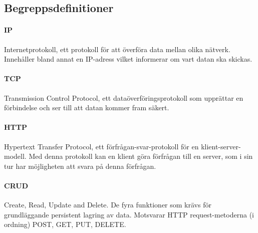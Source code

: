 \subsection{Begreppsdefinitioner}

\paragraph{IP} 
\label{ip}
Internetprotokoll, ett protokoll för att överföra data mellan olika nätverk. Innehåller bland annat en IP-adress vilket informerar om vart datan ska skickas. \parencite{inetF1}

\paragraph{TCP}
\label{tcp}
Transmission Control Protocol, ett dataöverföringsprotokoll som upprättar en förbindelse och ser till att datan kommer fram säkert. \parencite{inetF1}

\paragraph{HTTP}
\label{http}
Hypertext Transfer Protocol, ett förfrågan-svar-protokoll för en klient-server-modell. Med denna protokoll kan en klient göra förfrågan till en server, som i sin tur har möjligheten att svara på denna förfrågan. \parencite{http}

\paragraph{CRUD}
\label{crud}
Create, Read, Update and Delete. De fyra funktioner som krävs för grundläggande persistent lagring av data. Motsvarar HTTP request-metoderna (i ordning) POST, GET, PUT, DELETE.